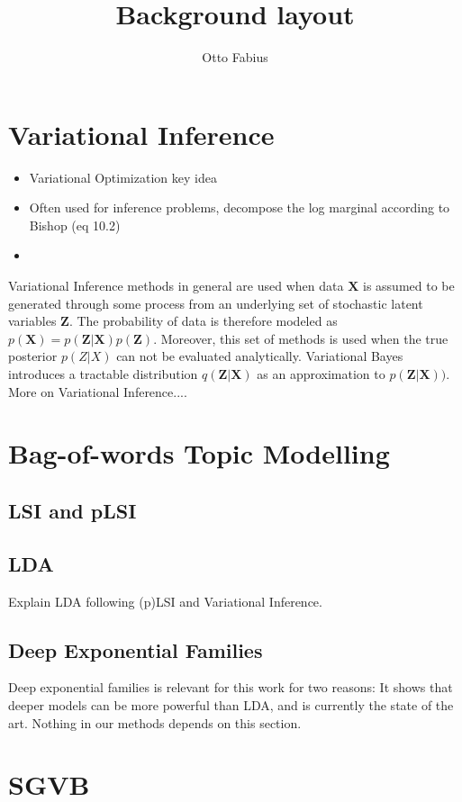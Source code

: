 \documentclass{article}
\author{Otto Fabius}
\title{Background layout}
\begin{document}
	
	\maketitle


\section{Variational Inference}
\begin{itemize}
	\item Variational Optimization key idea
	\item Often used for inference problems, decompose the log marginal according to Bishop (eq 10.2)
	\item 
\end{itemize}
Variational Inference methods in general are used when data $\mathbf{X}$ is assumed to be generated through some process from an underlying set of stochastic latent variables $\mathbf{Z}$. The probability of data is therefore modeled as $p(\mathbf{X}) = p(\mathbf{Z}|\mathbf{X})p(\mathbf{Z})$. Moreover, this set of methods is used when the true posterior $p(Z|X)$ can not be evaluated analytically. Variational Bayes introduces a tractable distribution $q(\mathbf{\mathbf{Z}|\mathbf{X}})$ as an approximation to $p(\mathbf{Z}|\mathbf{X}))$.
\\
More on Variational Inference....
\section{Bag-of-words Topic Modelling}

\subsection{LSI and pLSI}
\subsection{LDA}\label{LDA}
Explain LDA following (p)LSI and Variational Inference.
\subsection{Deep Exponential Families}\label{DEF}

Deep exponential families is relevant for this work for two reasons: It shows that deeper models can be more powerful than LDA, and is currently the state of the art. Nothing in our methods depends on this section.


\section{SGVB}\label{sgvb_section}
\end{document}
